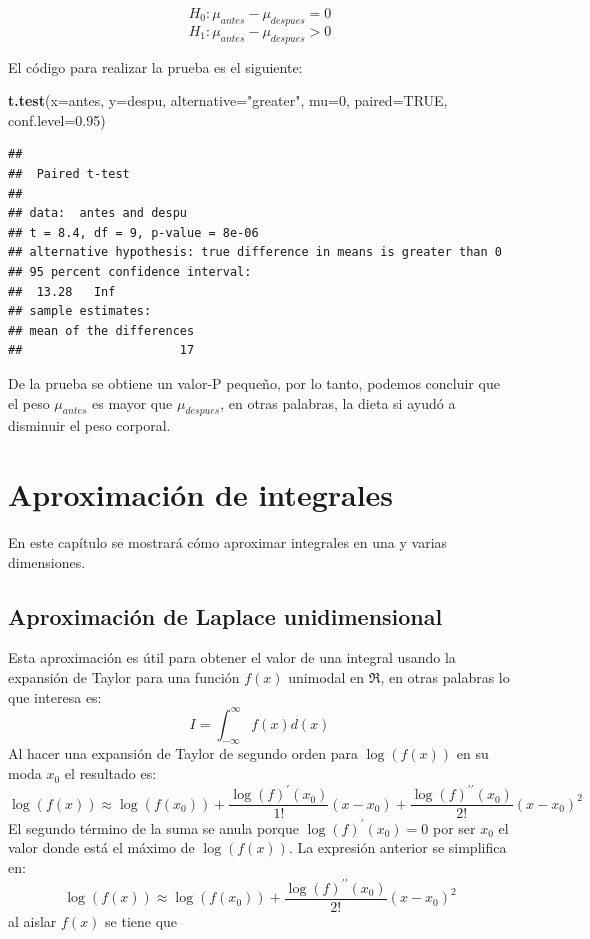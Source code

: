 \documentclass[10pt,]{krantz}
\makeatletter
\newenvironment{Shaded}{\begin{snugshade}}{\end{snugshade}}
\newcommand{\KeywordTok}[1]{\textcolor[rgb]{0.13,0.29,0.53}{\textbf{#1}}}
\newcommand{\DataTypeTok}[1]{\textcolor[rgb]{0.13,0.29,0.53}{#1}}
\newcommand{\DecValTok}[1]{\textcolor[rgb]{0.00,0.00,0.81}{#1}}
\newcommand{\FloatTok}[1]{\textcolor[rgb]{0.00,0.00,0.81}{#1}}
\newcommand{\StringTok}[1]{\textcolor[rgb]{0.31,0.60,0.02}{#1}}
\newcommand{\OtherTok}[1]{\textcolor[rgb]{0.56,0.35,0.01}{#1}}
\newcommand{\NormalTok}[1]{#1}
\newenvironment{kframe}{%
\medskip{}
\setlength{\fboxsep}{.8em}
 \def\at@end@of@kframe{}%
 \ifinner\ifhmode%
  \def\at@end@of@kframe{\end{minipage}}%
  \begin{minipage}{\columnwidth}%
 \fi\fi%
 \def\FrameCommand##1{\hskip\@totalleftmargin \hskip-\fboxsep
 \colorbox{shadecolor}{##1}\hskip-\fboxsep
     \hskip-\linewidth \hskip-\@totalleftmargin \hskip\columnwidth}%
 \MakeFramed {\advance\hsize-\width
   \@totalleftmargin\z@ \linewidth\hsize
   \@setminipage}}%
 {\par\unskip\endMakeFramed%
 \at@end@of@kframe}
\renewenvironment{Shaded}{\begin{kframe}}{\end{kframe}}
\makeatother
\begin{document}
\[H_0: \mu_{antes}  - \mu_{despues} = 0\]
\[H_1: \mu_{antes}  - \mu_{despues} > 0\]

El código para realizar la prueba es el siguiente:

\begin{Shaded}
\begin{Highlighting}[]
\KeywordTok{t.test}\NormalTok{(}\DataTypeTok{x=}\NormalTok{antes, }\DataTypeTok{y=}\NormalTok{despu, }\DataTypeTok{alternative=}\StringTok{"greater"}\NormalTok{, }\DataTypeTok{mu=}\DecValTok{0}\NormalTok{, }
       \DataTypeTok{paired=}\OtherTok{TRUE}\NormalTok{, }\DataTypeTok{conf.level=}\FloatTok{0.95}\NormalTok{)}
\end{Highlighting}
\end{Shaded}

\begin{verbatim}
## 
##  Paired t-test
## 
## data:  antes and despu
## t = 8.4, df = 9, p-value = 8e-06
## alternative hypothesis: true difference in means is greater than 0
## 95 percent confidence interval:
##  13.28   Inf
## sample estimates:
## mean of the differences 
##                      17
\end{verbatim}

De la prueba se obtiene un valor-P pequeño, por lo tanto, podemos
concluir que el peso \(\mu_{antes}\) es mayor que \(\mu_{despues}\), en
otras palabras, la dieta si ayudó a disminuir el peso corporal.

\chapter{Aproximación de integrales}\label{aproxint}

En este capítulo se mostrará cómo aproximar integrales en una y varias
dimensiones.

\section{Aproximación de Laplace
unidimensional}\label{aproximacion-de-laplace-unidimensional}

Esta aproximación es útil para obtener el valor de una integral usando
la expansión de Taylor para una función \(f(x)\) unimodal en \(\Re\), en
otras palabras lo que interesa es:
\[ I = \int_{-\infty}^{\infty} f(x) d(x)\] Al hacer una expansión de
Taylor de segundo orden para \(\log(f(x))\) en su moda \(x_0\) el
resultado es:
\[ \log(f(x)) \approx \log(f(x_0)) + \frac{\log(f)^\prime(x_0)}{1!} (x-x_0) + \frac{\log(f)^{\prime \prime}(x_0)}{2!} (x-x_0)^2 \]
El segundo término de la suma se anula porque \(\log(f)^\prime(x_0)=0\)
por ser \(x_0\) el valor donde está el máximo de \(\log(f(x))\). La
expresión anterior se simplifica en:
\[ \log(f(x)) \approx \log(f(x_0)) + \frac{\log(f)^{\prime \prime}(x_0)}{2!} (x-x_0)^2 \]
al aislar \(f(x)\) se tiene que
\end{document}
